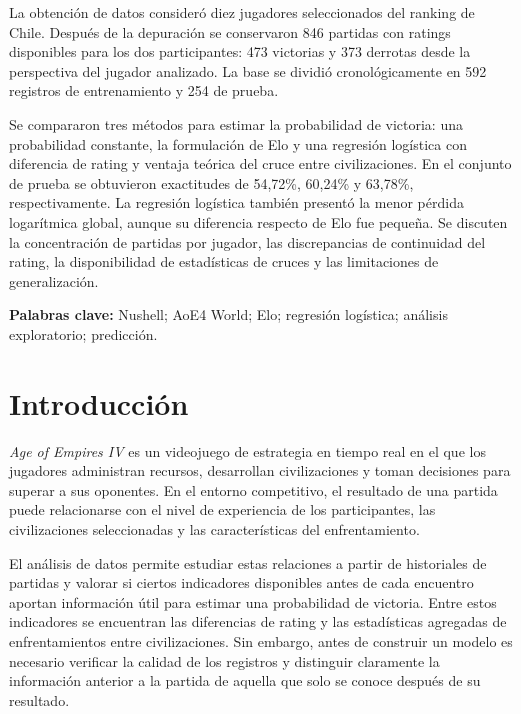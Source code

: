 \documentclass[12pt,a4paper]{article}
\begin{document}
La obtención de datos consideró diez jugadores seleccionados del ranking de Chile. Después de la depuración se conservaron 846 partidas con ratings disponibles para los dos participantes: 473 victorias y 373 derrotas desde la perspectiva del jugador analizado. La base se dividió cronológicamente en 592 registros de entrenamiento y 254 de prueba.

Se compararon tres métodos para estimar la probabilidad de victoria: una probabilidad constante, la formulación de Elo y una regresión logística con diferencia de rating y ventaja teórica del cruce entre civilizaciones. En el conjunto de prueba se obtuvieron exactitudes de 54,72\%, 60,24\% y 63,78\%, respectivamente. La regresión logística también presentó la menor pérdida logarítmica global, aunque su diferencia respecto de Elo fue pequeña. Se discuten la concentración de partidas por jugador, las discrepancias de continuidad del rating, la disponibilidad de estadísticas de cruces y las limitaciones de generalización.

\noindent\textbf{Palabras clave:} Nushell; AoE4 World; Elo; regresión logística; análisis exploratorio; predicción.

\clearpage
\tableofcontents
\clearpage
\listoftables
\clearpage
\listoffigures
\clearpage
{}
\setcounter{page}{1}

\section{Introducción}

\textit{Age of Empires IV} es un videojuego de estrategia en tiempo real en el que los jugadores administran recursos, desarrollan civilizaciones y toman decisiones para superar a sus oponentes. En el entorno competitivo, el resultado de una partida puede relacionarse con el nivel de experiencia de los participantes, las civilizaciones seleccionadas y las características del enfrentamiento.

El análisis de datos permite estudiar estas relaciones a partir de historiales de partidas y valorar si ciertos indicadores disponibles antes de cada encuentro aportan información útil para estimar una probabilidad de victoria. Entre estos indicadores se encuentran las diferencias de rating y las estadísticas agregadas de enfrentamientos entre civilizaciones. Sin embargo, antes de construir un modelo es necesario verificar la calidad de los registros y distinguir claramente la información anterior a la partida de aquella que solo se conoce después de su resultado.
\end{document}
